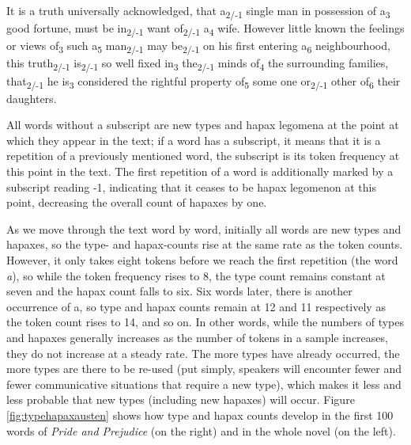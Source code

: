 \begin{exe}
\ex It is a truth universally acknowledged, that a\textsubscript{2/-1} single man in possession of a\textsubscript{3} good fortune, must be in\textsubscript{2/-1} want of\textsubscript{2/-1} a\textsubscript{4} wife. However little known the feelings or views of\textsubscript{3} such a\textsubscript{5} man\textsubscript{2/-1} may be\textsubscript{2/-1} on his first entering a\textsubscript{6} neighbourhood, this truth\textsubscript{2/-1} is\textsubscript{2/-1} so well fixed in\textsubscript{3} the\textsubscript{2/-1} minds of\textsubscript{4} the surrounding families, that\textsubscript{2/-1} he is\textsubscript{3} considered the rightful property of\textsubscript{5} some one or\textsubscript{2/-1} other of\textsubscript{6} their daughters.
\label{ex:prideandprejudicesample}
\end{exe}

All words without a subscript are new types and hapax legomena at the point at which they appear in the text; if a word has a subscript, it means that it is a repetition of a previously mentioned word, the subscript is its token frequency at this point in the text. The first repetition of a word is additionally marked by a subscript reading -1, indicating that it ceases to be hapax legomenon at this point, decreasing the overall count of hapaxes by one.

As we move through the text word by word, initially all words are new types and hapaxes, so the type- and hapax-counts rise at the same rate as the token counts. However, it only takes eight tokens before we reach the first repetition (the word \textit{a}), so while the token frequency rises to 8, the type count remains constant at seven and the hapax count falls to six. Six words later, there is another occurrence of a, so type and hapax counts remain at 12 and 11 respectively as the token count rises to 14, and so on. In other words, while the numbers of types and hapaxes generally increases as the number of tokens in a sample increases, they do not increase at a steady rate. The more types have already occurred, the more types are there to be re-used (put simply, speakers will encounter fewer and fewer communicative situations that require a new type), which makes it less and less probable that new types (including new hapaxes) will occur. Figure \ref{fig:typehapaxausten} shows how type and hapax counts develop in the first 100 words of \textit{Pride and Prejudice} (on the right) and in the whole novel (on the left).

